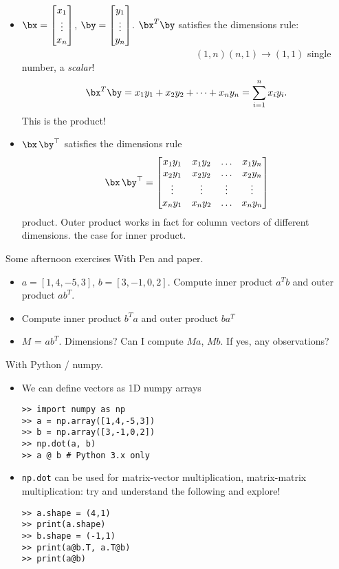 \documentclass[8pt]{beamer}
\newcommand{\myemph}[1]{{\color{blue}{#1}}}
\begin{document}
\begin{frame}
  \begin{itemize}
  \item  $\bx =
    \begin{bmatrix}
      x_1\\\vdots\\x_n
    \end{bmatrix}$, $\by =
    \begin{bmatrix}
      y_1\\\vdots\\y_n
    \end{bmatrix}$. $\bx^T \by$ satisfies the dimensions rule:\\
    ~~~~~~~~~~~~~~~~~~~~~~~~~~~~~~~~~~~~$(1,n)(n,1)\to(1,1)$ single number,  a \emph{scalar}!
    $$
    \bx^T \by =
    x_1 y_1 + x_2 y_2 + \dots + x_n y_n = \sum_{i=1}^{n} x_i y_i.
    $$
    This is the \myemph{inner} product! 
  \item $\bx\,\by^\top$ satisfies the dimensions rule
    $$
    \bx\,\by^\top =
    \begin{bmatrix}
      x_1 y_1 & x_1 y_2 & \hdots & x_1 y_n\\ 
      x_2 y_1 & x_2 y_2 & \hdots & x_2 y_n\\ 
      \vdots & \vdots &  \vdots & \vdots\\
      x_n y_1 & x_n y_2 & \hdots & x_n y_n\\ 
    \end{bmatrix}
    $$
    \myemph{Outer} product. Outer product works in fact for column
    vectors of different dimensions. \myemph{Not} the case for inner
    product.
  \end{itemize}
\end{frame}


\begin{frame}[fragile]{Some afternoon exercises}
  With Pen and paper.
  \begin{itemize}
  \item $a = [1,4,-5,3]$, $b = [3,-1,0,2]$. Compute inner product $a^T b$ and outer product $a b^T$.
  \item Compute inner product $b^T a$ and outer product $ba^T$
  \item $M$ = $ab^T$. Dimensions? Can I compute $M a$, $M b$. If yes, any observations?
  \end{itemize}
  With Python / numpy.
  \begin{itemize}
  \item We can define vectors as 1D numpy arrays 
\begin{verbatim}
>> import numpy as np
>> a = np.array([1,4,-5,3])
>> b = np.array([3,-1,0,2])
>> np.dot(a, b)
>> a @ b # Python 3.x only
\end{verbatim}
  \item \texttt{np.dot} can be used for matrix-vector multiplication, matrix-matrix multiplication: try and understand the following and explore!
\begin{verbatim}
>> a.shape = (4,1)
>> print(a.shape)
>> b.shape = (-1,1)
>> print(a@b.T, a.T@b)
>> print(a@b)
\end{verbatim}
  \end{itemize}
\end{frame}
\end{document}
